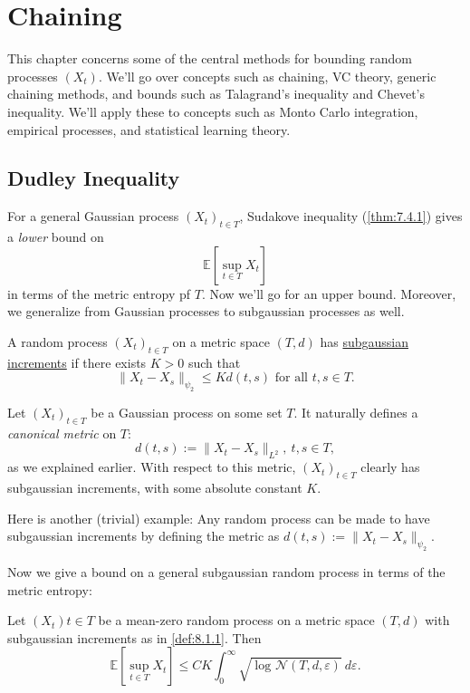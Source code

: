 \section{Chaining}
This chapter concerns some of the central methods for bounding random processes $(X_t)$. We'll go over concepts 
such as chaining, VC theory, generic chaining methods, and bounds such as Talagrand's inequality and Chevet's 
inequality. We'll apply these to concepts such as Monto Carlo integration, empirical processes, and statistical 
learning theory.



\subsection{Dudley Inequality}
For a general Gaussian process $(X_t)_{t \in T}$, Sudakove inequality (\cref{thm:7.4.1}) gives a \textit{lower} 
bound on 
\[ \mathbb{E}\left[ \sup_{t \in T}X_t \right] \]
in terms of the metric entropy pf $T$. Now we'll go for an upper bound. Moreover, we generalize from Gaussian 
processes to subgaussian processes as well.

\begin{definition}[]
\label{def:8.1.1}
A random process $(X_t)_{t \in T}$ on a metric space $(T, d)$ has \underline{subgaussian increments} if there 
exists $K > 0$ such that 
\[ \lVert X_t - X_s \rVert_{\psi_2} \leq Kd(t, s) \text{ for all } t, s \in T. \]
\end{definition}

\begin{example}
\label{ex:8.1.2}
Let $(X_t)_{t \in T}$ be a Gaussian process on some set $T$. It naturally defines a \textit{canonical metric} 
on $T$: 
\[ d(t, s) := \lVert X_t - X_s \rVert_{L^2}, \ t, s \in T, \]
as we explained earlier. With respect to this metric, $(X_t)_{t \in T}$ clearly has subgaussian increments, 
with some absolute constant $K$.
\end{example}

Here is another (trivial) example: Any random process can be made to have subgaussian increments by defining 
the metric as $d(t, s) := \lVert X_t - X_s \rVert_{\psi_2}$.

Now we give a bound on a general subgaussian random process in terms of the metric entropy:

\begin{theorem}
\label{thm:8.1.3}
Let $(X_t){t \in T}$ be a mean-zero random process on a metric space $(T, d)$ with subgaussian increments as in 
\cref{def:8.1.1}. Then 
\[ \mathbb{E}\left[ \sup_{t \in T}X_t \right] \leq CK \int_{0}^{\infty} 
\sqrt{\log_{}{\mathcal{N}(T, d, \varepsilon)}} \ d \varepsilon. \]
\end{theorem}

